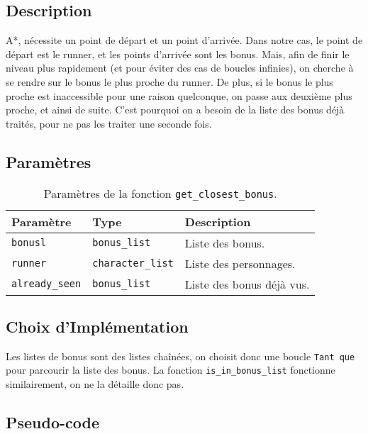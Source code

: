 \subsection{Description}

A*, nécessite un point de départ et un point d'arrivée.
Dans notre cas, le point de départ est le runner, et les points d'arrivée sont les bonus.
Mais, afin de finir le niveau plus rapidement (et pour éviter des cas de boucles infinies), on cherche à se rendre sur le bonus le plus proche du runner.
\newline
De plus, si le bonus le plus proche est inaccessible pour une raison quelconque, on passe aux deuxième plus proche, et ainsi de suite.
C'est pourquoi on a besoin de la liste des bonus déjà traités, pour ne pas les traiter une seconde fois.

\subsection{Paramètres}

\begin{table}[!htpb]
    \begin{tabularx}{\textwidth}{lXX}
        \toprule
        \textbf{Paramètre} & \textbf{Type} & \textbf{Description} \\
        \midrule
        \texttt{bonusl} & \texttt{bonus\_list} & Liste des bonus. \\
        \texttt{runner} & \texttt{character\_list} & Liste des personnages. \\
        \texttt{already\_seen} & \texttt{bonus\_list} & Liste des bonus déjà vus. \\
        \bottomrule
    \end{tabularx}
    \caption{Paramètres de la fonction \texttt{get\_closest\_bonus}.}
    \label{tab:parameters-get_closest_bonus}
\end{table}

\subsection{Choix d'Implémentation}

Les listes de bonus sont des listes chaînées, on choisit donc une boucle \texttt{Tant que} pour parcourir la liste des bonus.
La fonction \texttt{is\_in\_bonus\_list} fonctionne similairement, on ne la détaille donc pas.

\newpage

\subsection{Pseudo-code}

